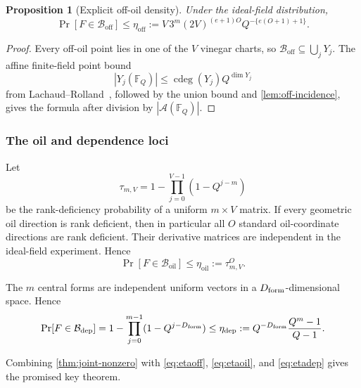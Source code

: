 \documentclass[10pt,a4paper]{article}
\newtheorem{proposition}[theorem]{Proposition}
\newcommand{\F}{\mathbb F}
\newcommand{\cB}{\mathcal B}
\newcommand{\cdeg}{\operatorname{cdeg}}
\newcommand{\oil}{\mathrm{oil}}
\newcommand{\off}{\mathrm{off}}
\newcommand{\dep}{\mathrm{dep}}
\begin{document}
\begin{proposition}[Explicit off-oil density]\label{prop:off-density}
Under the ideal-field distribution,
\begin{equation}\label{eq:etaoff}
\Pr[F\in\cB_{\off}]
\le
\eta_{\off}:=
V\,3^m(2V)^{(e+1)O}
Q^{-\{e(O+1)+1\}}.
\end{equation}
\end{proposition}

\begin{proof}
Every off-oil point lies in one of the $V$ vinegar charts, so $\cB_{\off}\subseteq\bigcup_jY_j$.  The affine finite-field point bound
\[
|Y_j(\F_Q)|\le\cdeg(Y_j)Q^{\dim Y_j}
\]
from Lachaud--Rolland~\cite{LachaudRolland}, followed by the union bound and \cref{lem:off-incidence}, gives the formula after division by $|\mathcal A(\F_Q)|$.
\end{proof}

\subsubsection{The oil and dependence loci}

Let
\[
\tau_{m,V}=1-\prod_{j=0}^{V-1}(1-Q^{j-m})
\]
be the rank-deficiency probability of a uniform $m\times V$ matrix.  If every geometric oil direction is rank deficient, then in particular all $O$ standard oil-coordinate directions are rank deficient.  Their derivative matrices are independent in the ideal-field experiment.  Hence
\begin{equation}\label{eq:etaoil}
\Pr[F\in\cB_{\oil}]\le\eta_{\oil}:=\tau_{m,V}^{O}.
\end{equation}

The $m$ central forms are independent uniform vectors in a $D_{\rm form}$-dimensional space.  Hence
\begin{equation}\label{eq:etadep}
\Pr[F\in\cB_{\dep}]
=1-\prod_{j=0}^{m-1}(1-Q^{j-D_{\rm form}})
\le
\eta_{\dep}:=
Q^{-D_{\rm form}}\frac{Q^m-1}{Q-1}.
\end{equation}

Combining \cref{thm:joint-nonzero} with
\eqref{eq:etaoff}, \eqref{eq:etaoil}, and \eqref{eq:etadep} gives the promised key theorem.
\end{document}
